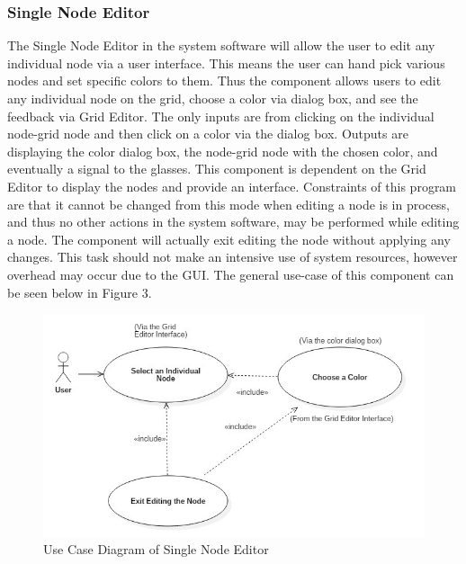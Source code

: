 \documentclass[12pt]{article}
\begin{document}
	\subsubsection {Single Node Editor}
  	The Single Node Editor in the system software will allow the user to edit any individual node via a user interface. This means the user can hand pick various nodes and set specific colors to them. Thus the component allows users to edit any individual node on the grid, choose a color via dialog box, and see the feedback via Grid Editor. The only inputs are from clicking on the individual node-grid node and then click on a color via the dialog box. Outputs are displaying the color dialog box, the node-grid node with the chosen color, and eventually a signal to the glasses. This component is dependent on the Grid Editor to display the nodes and provide an interface. Constraints of this program are that it cannot be changed from this mode when editing a node is in process, and thus no other actions in the system software, may be performed while editing a node. The component will actually exit editing the node without applying any changes. This task should not make an intensive use of system resources, however overhead may occur due to the GUI. The general use-case of this component can be seen below in Figure 3.  	
  	\begin{figure}[ht!]
  		\centering
  		\includegraphics[width=\linewidth]{SingleNodeEditorDiagram.JPG}
  		\caption{Use Case Diagram of Single Node Editor \label{overflow}}
  	\end{figure}
  
\end{document}

